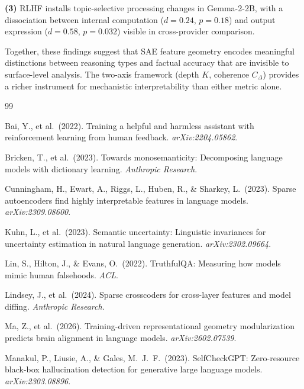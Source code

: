 \documentclass[10pt]{article}
\begin{document}
\textbf{(3)} RLHF installs topic-selective processing changes in Gemma-2-2B, with a dissociation between internal computation ($d = 0.24$, $p = 0.18$) and output expression ($d = 0.58$, $p = 0.032$) visible in cross-provider comparison.

Together, these findings suggest that SAE feature geometry encodes meaningful distinctions between reasoning types and factual accuracy that are invisible to surface-level analysis. The two-axis framework (depth $K$, coherence $C_{\Delta}$) provides a richer instrument for mechanistic interpretability than either metric alone.


\begin{thebibliography}{99}

Bai, Y., et al.\ (2022).
Training a helpful and harmless assistant with reinforcement learning from human feedback.
\textit{arXiv:2204.05862}.

Bricken, T., et al.\ (2023).
Towards monosemanticity: Decomposing language models with dictionary learning.
\textit{Anthropic Research}.

Cunningham, H., Ewart, A., Riggs, L., Huben, R., \& Sharkey, L.\ (2023).
Sparse autoencoders find highly interpretable features in language models.
\textit{arXiv:2309.08600}.

Kuhn, L., et al.\ (2023).
Semantic uncertainty: Linguistic invariances for uncertainty estimation in natural language generation.
\textit{arXiv:2302.09664}.

Lin, S., Hilton, J., \& Evans, O.\ (2022).
TruthfulQA: Measuring how models mimic human falsehoods.
\textit{ACL}.

Lindsey, J., et al.\ (2024).
Sparse crosscoders for cross-layer features and model diffing.
\textit{Anthropic Research}.

Ma, Z., et al.\ (2026).
Training-driven representational geometry modularization predicts brain alignment in language models.
\textit{arXiv:2602.07539}.

Manakul, P., Liusie, A., \& Gales, M.~J.~F.\ (2023).
SelfCheckGPT: Zero-resource black-box hallucination detection for generative large language models.
\textit{arXiv:2303.08896}.


\end{thebibliography}
\end{document}
